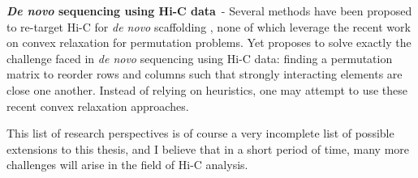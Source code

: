 \textbf{\textit{De novo} sequencing using Hi-C data}\ - Several methods have
been proposed to re-target Hi-C for \textit{de novo} scaffolding
\citep{burton:chromosome, kaplan:high-throughput, marie-nelly:high-quality},
none of which leverage the recent work on convex relaxation for permutation
problems. Yet \citet{fogel:convex} proposes to solve exactly the challenge
faced in \textit{de novo} sequencing using Hi-C data: finding a permutation
matrix to reorder rows and columns such that strongly interacting elements are
close one another. Instead of relying on heuristics, one may attempt to use
these recent convex relaxation approaches.

This list of research perspectives is of course a very incomplete list of
possible extensions to this thesis, and I believe that in a short period of
time, many more challenges will arise in the field of Hi-C analysis.

